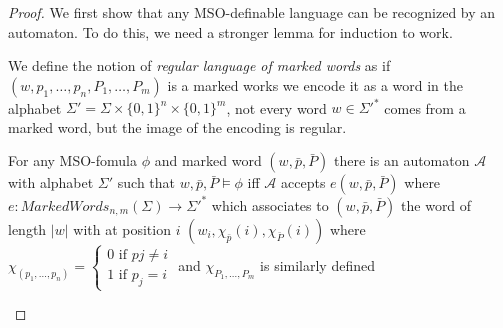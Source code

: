 \begin{proof}
	We first show that any MSO-definable language can be recognized by an
	automaton. To do this, we need a stronger lemma for induction to work.

	We define the notion of \emph{regular language of marked words} as
	if $(w, p_{1}, \ldots, p_{n}, P_{1}, \ldots, P_{m})$ is 
	a marked works we encode it as a word in the alphabet
	$\Sigma' = \Sigma \times \{0, 1\}^{n}\times\{0,1\}^{m}$, not
	every word $w \in \Sigma'^*$ comes from a marked word,
	but the image of the encoding is regular.

	\begin{lemma} For any MSO-fomula $\phi$ and  marked word
		$(w, \bar{p}, \bar{P})$ there is an automaton $\mathcal{A}$ 
		with alphabet $\Sigma'$ such that
		$w, \bar{p}, \bar{P} \models \phi$ iff $\mathcal{A}$ accepts
		$e(w, \bar{p}, \bar{P})$ where 
		$e: MarkedWords_{n,m}(\Sigma) \to \Sigma'^*$ which associates
		to $(w, \bar{p}, \bar{P})$ the word of length $|w|$ with
		at position $i$ $(w_{i}, \chi_{\bar{p}}(i), \chi_{\bar{P}}(i))$ 
		where 
		$\chi_{(p_{1},\ldots,p_{n})}= \begin{cases} 
			0 \text{ if } pj \neq i\\ 
			1 \text{ if } p_{j} = i
		\end{cases}$
		and $\chi_{P_{1}, \ldots, P_{m}}$ is similarly defined
	\end{lemma}


\end{proof}
